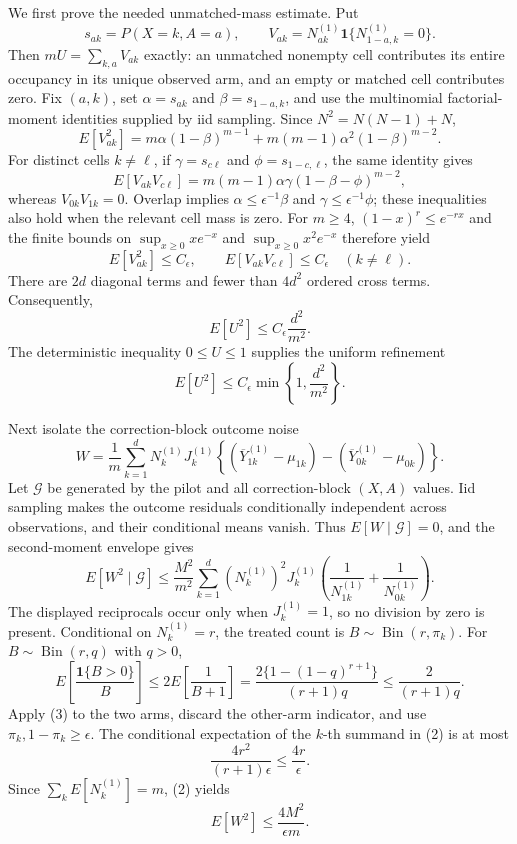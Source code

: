 We first prove the needed unmatched-mass estimate.  Put
\[
 s_{ak}=P(X=k,A=a),\qquad
 V_{ak}=N_{ak}^{(1)}\mathbf 1\{N_{1-a,k}^{(1)}=0\}.
\]
Then \(mU=\sum_{k,a}V_{ak}\) exactly: an unmatched nonempty cell contributes its entire occupancy in its unique observed arm, and an empty or matched cell contributes zero.  Fix \((a,k)\), set \(\alpha=s_{ak}\) and \(\beta=s_{1-a,k}\), and use the multinomial factorial-moment identities supplied by iid sampling.  Since \(N^2=N(N-1)+N\),
\[
 E[V_{ak}^2]
 =m\alpha(1-\beta)^{m-1}
  +m(m-1)\alpha^2(1-\beta)^{m-2}.
\]
For distinct cells \(k\ne\ell\), if \(\gamma=s_{c\ell}\) and \(\phi=s_{1-c,\ell}\), the same identity gives
\[
 E[V_{ak}V_{c\ell}]
 =m(m-1)\alpha\gamma(1-\beta-\phi)^{m-2},
\]
whereas \(V_{0k}V_{1k}=0\).  Overlap implies
\(
 \alpha\leq\epsilon^{-1}\beta
\)
and
\(
 \gamma\leq\epsilon^{-1}\phi
\);
these inequalities also hold when the relevant cell mass is zero.  For \(m\geq4\), \((1-x)^r\leq e^{-rx}\) and the finite bounds on \(\sup_{x\geq0}xe^{-x}\) and \(\sup_{x\geq0}x^2e^{-x}\) therefore yield
\[
 E[V_{ak}^2]\leq C_{\epsilon},
 \qquad
 E[V_{ak}V_{c\ell}]\leq C_{\epsilon}\quad(k\ne\ell).
\]
There are \(2d\) diagonal terms and fewer than \(4d^2\) ordered cross terms.  Consequently,
\[
 E[U^2]\leq C_{\epsilon}\frac{d^2}{m^2}.
\]
The deterministic inequality \(0\leq U\leq1\) supplies the uniform refinement
\[
 E[U^2]\leq C_{\epsilon}\min\left\{1,\frac{d^2}{m^2}\right\}. \tag{1}
\]

Next isolate the correction-block outcome noise
\[
 W=\frac1m\sum_{k=1}^dN_k^{(1)}J_k^{(1)}
 \left\{(\overline Y_{1k}^{(1)}-\mu_{1k})
 -(\overline Y_{0k}^{(1)}-\mu_{0k})\right\}.
\]
Let \(\mathscr G\) be generated by the pilot and all correction-block \((X,A)\) values.  Iid sampling makes the outcome residuals conditionally independent across observations, and their conditional means vanish.  Thus \(E[W\mid\mathscr G]=0\), and the second-moment envelope gives
\[
 E[W^2\mid\mathscr G]
 \leq \frac{M^2}{m^2}\sum_{k=1}^d
 (N_k^{(1)})^2J_k^{(1)}
 \left(\frac1{N_{1k}^{(1)}}+\frac1{N_{0k}^{(1)}}\right). \tag{2}
\]
The displayed reciprocals occur only when \(J_k^{(1)}=1\), so no division by zero is present.  Conditional on \(N_k^{(1)}=r\), the treated count is \(B\sim\operatorname{Bin}(r,\pi_k)\).  For \(B\sim\operatorname{Bin}(r,q)\) with \(q>0\),
\[
 E\left[\frac{\mathbf1\{B>0\}}B\right]
 \leq2E\left[\frac1{B+1}\right]
 =\frac{2\{1-(1-q)^{r+1}\}}{(r+1)q}
 \leq\frac2{(r+1)q}. \tag{3}
\]
Apply (3) to the two arms, discard the other-arm indicator, and use \(\pi_k,1-\pi_k\geq\epsilon\).  The conditional expectation of the \(k\)-th summand in (2) is at most
\[
 \frac{4r^2}{(r+1)\epsilon}\leq\frac{4r}{\epsilon}.
\]
Since \(\sum_kE[N_k^{(1)}]=m\), (2) yields
\[
 E[W^2]\leq\frac{4M^2}{\epsilon m}. \tag{4}
\]

